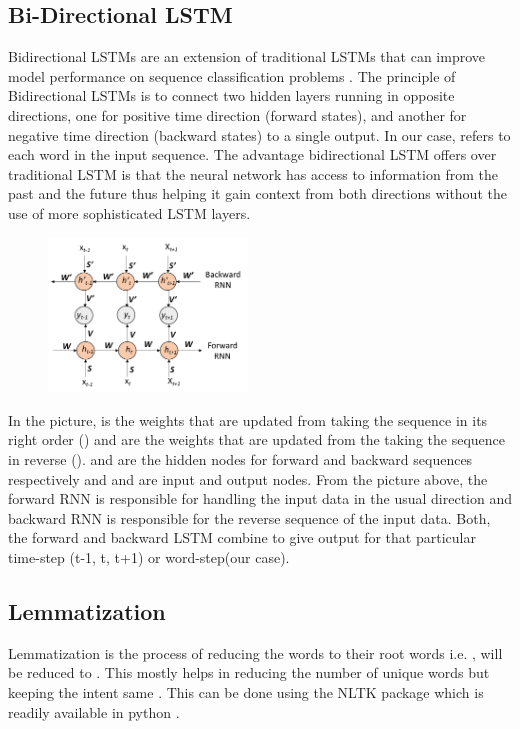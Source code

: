 \subsection{Bi-Directional LSTM} Bidirectional LSTMs are an extension of traditional LSTMs that can improve model performance on sequence classification problems \cite{Schuster97bidirectionalrecurrent}. The principle of Bidirectional LSTMs is to connect two hidden layers running in opposite directions, one for positive time direction (forward states), and another for negative time direction (backward states) to a single output. In our case,  refers to each word in the input sequence. The advantage bidirectional LSTM offers over traditional LSTM is that the neural network has access to information from the past and the future thus helping it gain context from both directions without the use of more sophisticated LSTM layers.
\begin{figure}[h]
	\begin{center}
		\includegraphics[width=150pt]{figures/bidirectional.png}
		\label{fig:bidilstm}
	\end{center}
\end{figure}\newline
In the picture,  is the weights that are updated from taking the sequence in its right order () and  are the weights that are updated from the taking the sequence in reverse ().  and  are the hidden nodes for forward and backward sequences respectively and  and  are input and output nodes.
From the picture above, the forward RNN is responsible for handling the input data in the usual direction and backward RNN is responsible for the reverse sequence of the input data. Both, the forward and backward LSTM combine to give output for that particular time-step (t-1, t, t+1) or word-step(our case).
\subsection{Lemmatization}
Lemmatization is the process of reducing the words to their root words i.e. ,  will be reduced to . This mostly helps in reducing the number of unique words but keeping the intent same \cite{Manning:2008:IIR:1394399}. This can be done using the NLTK package which is readily available in python \cite{Loper:2002:NNL:1118108.1118117}.
